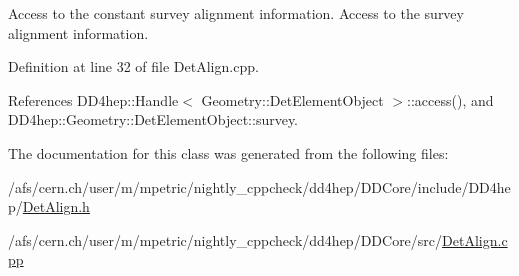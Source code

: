 Access to the constant survey alignment information. Access to the survey alignment information. 

Definition at line 32 of file DetAlign.cpp.

References DD4hep::Handle$<$ Geometry::DetElementObject $>$::access(), and DD4hep::Geometry::DetElementObject::survey.

The documentation for this class was generated from the following files:\begin{DoxyCompactItemize}
\item 
/afs/cern.ch/user/m/mpetric/nightly\_\-cppcheck/dd4hep/DDCore/include/DD4hep/\hyperlink{_det_align_8h}{DetAlign.h}\item 
/afs/cern.ch/user/m/mpetric/nightly\_\-cppcheck/dd4hep/DDCore/src/\hyperlink{_det_align_8cpp}{DetAlign.cpp}\end{DoxyCompactItemize}
